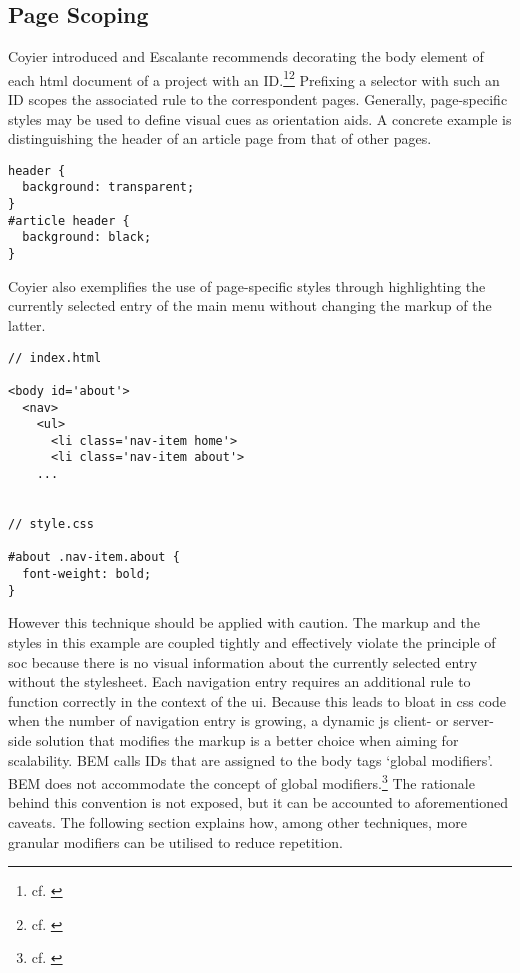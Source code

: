 \subsection{Page Scoping}
Coyier introduced and Escalante recommends decorating the body element of each \gls{html} document of a project with an ID.\footnote{cf. \cite{coyieridbody}}\footnote{cf. \cite{mpgcss}}
Prefixing a selector with such an ID scopes the associated rule to the correspondent pages.
Generally, page-specific styles may be used to define visual cues as orientation aids.
A concrete example is distinguishing the header of an article page from that of other pages.

\begin{lstlisting}
header {
  background: transparent;
}
#article header {
  background: black;
}
\end{lstlisting}

Coyier also exemplifies the use of page-specific styles through highlighting the currently selected entry of the main menu without changing the markup of the latter.

\pagebreak
{}
\begin{lstlisting}
// index.html

<body id='about'>
  <nav>
    <ul>
      <li class='nav-item home'>
      <li class='nav-item about'>
    ...


// style.css

#about .nav-item.about {
  font-weight: bold;
}

\end{lstlisting}

However this technique should be applied with caution.
The markup and the styles in this example are coupled tightly and effectively violate the principle of \gls{soc} because there is no visual information about the currently selected entry without the stylesheet.
Each navigation entry requires an additional rule to function correctly in the context of the \gls{ui}.
Because this leads to bloat in \gls{css} code when the number of navigation entry is growing, a dynamic \gls{js} client- or server-side solution that modifies the markup is a better choice when aiming for scalability.
BEM calls IDs that are assigned to the body tags `global modifiers'.
BEM does not accommodate the concept of global modifiers.\footnote{cf. \cite{bemfaq}}
The rationale behind this convention is not exposed, but it can be accounted to aforementioned caveats.
The following section explains how, among other techniques, more granular modifiers can be utilised to reduce repetition.
